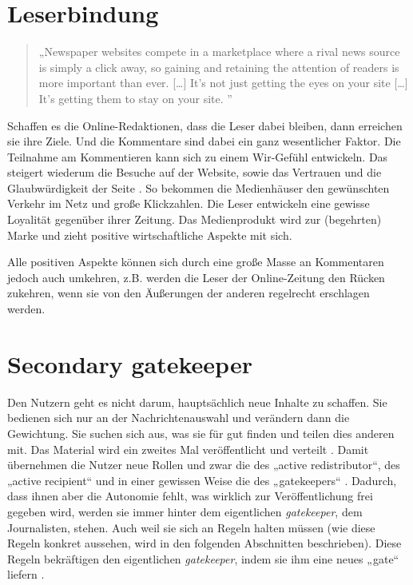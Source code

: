 \section{Leserbindung}

\begin{quote}
„Newspaper websites compete in a marketplace where a rival news source is simply
a click away, so gaining and retaining the attention of readers is more
important than ever. [\ldots] It’s not just getting the eyes on your site
[\ldots] It’s getting them to stay on your site. ” \autocite[S.~144]{singer}
\end{quote}

Schaffen es die Online-Redaktionen, dass die Leser dabei bleiben, dann erreichen
sie ihre Ziele. Und die Kommentare sind dabei ein ganz wesentlicher Faktor. Die
Teilnahme am Kommentieren kann sich zu einem Wir-Gefühl entwickeln. Das steigert
wiederum die Besuche auf der Website, sowie das Vertrauen und die
Glaubwürdigkeit der Seite \autocite[S.~215]{meyer-carey}. So bekommen die
Medienhäuser den gewünschten Verkehr im Netz und große Klickzahlen. Die Leser
entwickeln eine gewisse Loyalität gegenüber ihrer Zeitung. Das Medienprodukt
wird zur (begehrten) Marke und zieht positive wirtschaftliche Aspekte mit sich.

Alle positiven Aspekte können sich durch eine große Masse an Kommentaren jedoch
auch umkehren, z.B. werden die Leser der Online-Zeitung den Rücken zukehren,
wenn sie von den Äußerungen der anderen regelrecht erschlagen werden.


\section{Secondary gatekeeper}

Den Nutzern geht es nicht darum, hauptsächlich neue Inhalte zu schaffen. Sie
bedienen sich nur an der Nachrichtenauswahl und verändern dann die Gewichtung.
Sie suchen sich aus, was sie für gut finden und teilen dies anderen mit. Das
Material wird ein zweites Mal veröffentlicht und verteilt
\autocite[S.~66]{singer:2014}. Damit übernehmen die Nutzer neue Rollen und zwar
die des „active redistributor“, des „active recipient“ und in einer gewissen
Weise die des „gatekeepers“ \autocite[S.~57]{singer:2014}. Dadurch, dass ihnen
aber die Autonomie fehlt, was wirklich zur Veröffentlichung frei gegeben wird,
werden sie immer hinter dem eigentlichen \emph{gatekeeper}, dem Journalisten,
stehen. Auch weil sie sich an Regeln halten müssen (wie diese Regeln konkret
aussehen, wird in den folgenden Abschnitten beschrieben). Diese Regeln
bekräftigen den eigentlichen \emph{gatekeeper}, indem sie ihm eine neues „gate“
liefern \autocite[S.~13]{santana:2014}.

